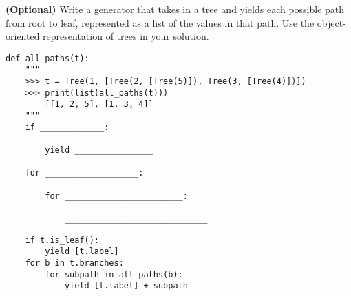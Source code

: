 \question \textbf{(Optional)} Write a generator that takes in a tree and yields each possible path from root to leaf, 
represented as a list of the values in that path. Use the object-oriented representation of trees in your solution.
\newline

\begin{lstlisting}
def all_paths(t):
    """
    >>> t = Tree(1, [Tree(2, [Tree(5)]), Tree(3, [Tree(4)])])
    >>> print(list(all_paths(t)))
        [[1, 2, 5], [1, 3, 4]]
    """
    if _____________:
		
        yield ________________
				
    for ___________________:
		
        for ________________________:
				
            _____________________________
\end{lstlisting}

\begin{solution}[0.5in]
\begin{lstlisting}
    if t.is_leaf():
        yield [t.label]
    for b in t.branches:
        for subpath in all_paths(b):
            yield [t.label] + subpath
\end{lstlisting}
\end{solution}
